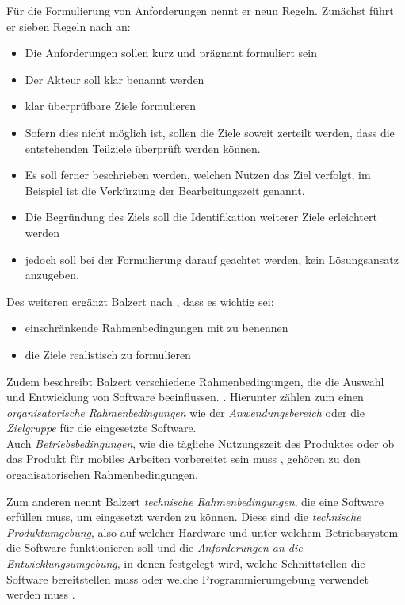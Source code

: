Für die Formulierung von Anforderungen nennt er neun Regeln. Zunächst führt er sieben Regeln nach \cite[][S. 100 ff.]{Pohl2007} an:
\begin{itemize}
\item Die Anforderungen sollen kurz und prägnant formuliert sein 
\item Der Akteur soll klar benannt werden
\item klar überprüfbare Ziele formulieren
\item Sofern dies nicht möglich ist, sollen die Ziele soweit zerteilt werden, dass die entstehenden Teilziele überprüft werden können.
\item Es soll ferner beschrieben werden, welchen Nutzen das Ziel verfolgt, im Beispiel ist die Verkürzung der Bearbeitungszeit genannt.
\item Die Begründung des Ziels soll die Identifikation weiterer Ziele erleichtert werden 
\item jedoch soll bei der Formulierung darauf geachtet werden, kein Lösungsansatz anzugeben. 
\end{itemize}
Des weiteren ergänzt Balzert nach \cite[][S. 100 f.]{Rupp2007}, dass es wichtig sei:
\begin{itemize}
\item einschränkende Rahmenbedingungen mit zu benennen 
\item die Ziele realistisch zu formulieren 
\end{itemize}
\citep[vgl.][S. 457 ff.]{Balzert2010}


Zudem beschreibt Balzert verschiedene Rahmenbedingungen, die die Auswahl und Entwicklung von Software beeinflussen. \citep[][459]{Balzert2010}.
Hierunter zählen zum einen \textit{organisatorische Rahmenbedingungen} wie der \textit{Anwendungsbereich} oder die \textit{Zielgruppe} für die eingesetzte Software. \\
Auch \textit{Betriebsbedingungen}, wie die tägliche Nutzungszeit des Produktes oder ob das Produkt \zb für mobiles Arbeiten vorbereitet sein muss \citep[vgl.][S. 459 f.]{Balzert2010}, gehören zu den organisatorischen Rahmenbedingungen.

Zum anderen nennt Balzert \textit{technische Rahmenbedingungen}, die eine Software erfüllen muss, um eingesetzt werden zu können. Diese sind die \textit{technische Produktumgebung}, also auf welcher Hardware und unter welchem Betriebssystem die Software funktionieren soll und die \textit{Anforderungen an die Entwicklungsumgebung}, in denen \ua festgelegt wird, welche Schnittstellen die Software bereitstellen muss oder welche Programmierumgebung verwendet werden muss \citep[vgl.][S. 460 f.]{Balzert2010}.


